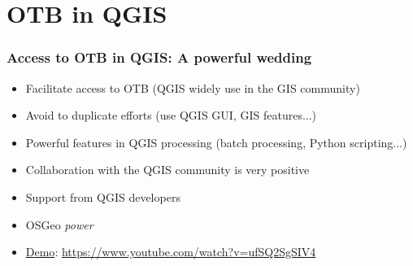 \documentclass[8pt]{beamer}
\begin{document}
\section{OTB in QGIS}
%
\begin{frame}
\frametitle{Access to OTB in QGIS: A powerful wedding}
\begin{itemize}
\item Facilitate access to OTB (QGIS widely use in the GIS community)
\item Avoid to duplicate efforts (use QGIS GUI, GIS features...)
\item Powerful features in QGIS processing (batch processing, Python scripting...)
\item Collaboration with the QGIS community is very positive
\item Support from QGIS developers
\item OSGeo \textit{power}
\item \href{https://www.youtube.com/watch?v=ufSQ2SgSIV4}{Demo}: \url{https://www.youtube.com/watch?v=ufSQ2SgSIV4}
\end{itemize}
\end{frame}
\end{document}

